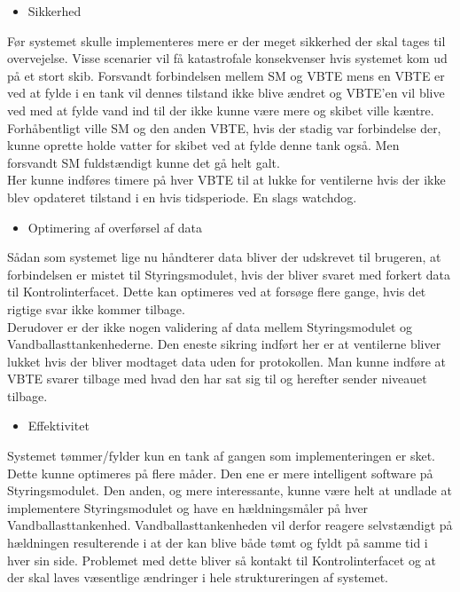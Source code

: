 \begin{large}\begin{itemize}
\item Sikkerhed
\end{itemize}\end{large}
Før systemet skulle implementeres mere er der meget sikkerhed der skal tages til overvejelse. Visse scenarier vil få katastrofale konsekvenser hvis systemet kom ud på et stort skib. Forsvandt forbindelsen mellem SM og VBTE mens en VBTE er ved at fylde i en tank vil dennes tilstand ikke blive ændret og VBTE'en vil blive ved med at fylde vand ind til der ikke kunne være mere og skibet ville kæntre. Forhåbentligt ville SM og den anden VBTE, hvis der stadig var forbindelse der, kunne oprette holde vatter for skibet ved at fylde denne tank også. Men forsvandt SM fuldstændigt kunne det gå helt galt.\\
Her kunne indføres timere på hver VBTE til at lukke for ventilerne hvis der ikke blev opdateret tilstand i en hvis tidsperiode. En slags watchdog.
\begin{large}\begin{itemize}
\item Optimering af overførsel af data
\end{itemize}\end{large}
Sådan som systemet lige nu håndterer data bliver der udskrevet til brugeren, at forbindelsen er mistet til Styringsmodulet, hvis der bliver svaret med forkert data til Kontrolinterfacet. Dette kan optimeres ved at forsøge flere gange, hvis det rigtige svar ikke kommer tilbage.\\
Derudover er der ikke nogen validering af data mellem Styringsmodulet og Vandballasttankenhederne. Den eneste sikring indført her er at ventilerne bliver lukket hvis der bliver modtaget data uden for protokollen. Man kunne indføre at VBTE svarer tilbage med hvad den har sat sig til og herefter sender niveauet tilbage.
\begin{large}\begin{itemize}
\item Effektivitet
\end{itemize}\end{large}
Systemet tømmer/fylder kun en tank af gangen som implementeringen er sket. Dette kunne optimeres på flere måder. Den ene er mere intelligent software på Styringsmodulet. Den anden, og mere interessante, kunne være helt at undlade at implementere Styringsmodulet og have en hældningsmåler på hver Vandballasttankenhed. Vandballasttankenheden vil derfor reagere selvstændigt på hældningen resulterende i at der kan blive både tømt og fyldt på samme tid i hver sin side. Problemet med dette bliver så kontakt til Kontrolinterfacet og at der skal laves væsentlige ændringer i hele struktureringen af systemet.\\
